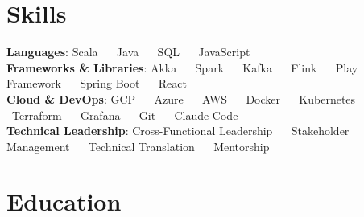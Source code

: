 \documentclass[letterpaper,11pt]{article}
\newcommand{\resumeSubHeadingListStart}{\begin{itemize}[leftmargin=0.15in, label={}]}
\newcommand{\resumeSubHeadingListEnd}{\end{itemize}}
\begin{document}
\section{Skills}
\begin{itemize}[leftmargin=0.15in, label={}]
  \small{\item{
    \textbf{Languages}: \quad Scala \ \textbf{\textbar} \ Java \ \textbf{\textbar} \ SQL \ \textbf{\textbar} \ JavaScript \\
    \textbf{Frameworks \& Libraries}: \quad Akka \ \textbf{\textbar} \ Spark \ \textbf{\textbar} \ Kafka \ \textbf{\textbar} \ Flink \ \textbf{\textbar} \ Play Framework \ \textbf{\textbar} \ Spring Boot \ \textbf{\textbar} \ React \\
    \textbf{Cloud \& DevOps}: \quad GCP \ \textbf{\textbar} \ Azure \ \textbf{\textbar} \ AWS \ \textbf{\textbar} \ Docker \ \textbf{\textbar} \ Kubernetes \ \textbf{\textbar} \ Terraform \ \textbf{\textbar} \ Grafana \ \textbf{\textbar} \ Git \ \textbf{\textbar} \ Claude Code \\
    \textbf{Technical Leadership}: \quad Cross-Functional Leadership \ \textbf{\textbar} \ Stakeholder Management \ \textbf{\textbar} \ Technical Translation \ \textbf{\textbar} \ Mentorship
  }}
\end{itemize}

\section{Education}
  \resumeSubHeadingListStart
    
  \resumeSubHeadingListEnd


\end{document}
